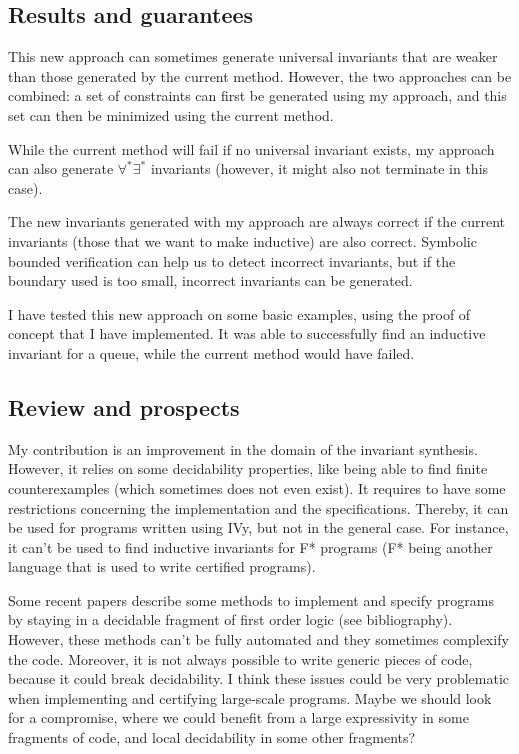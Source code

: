 \documentclass{article}
\newenvironment{point}[1]%
{\subsection*{#1}}%
{}
\begin{document}
\begin{point}{Results and guarantees}

  This new approach can sometimes generate universal invariants that are weaker than those generated by the current
  method. However, the two approaches can be combined: a set of constraints can first be generated using my approach,
  and this set can then be minimized using the current method.

  While the current method will fail if no universal invariant exists,
  my approach can also generate \(\forall^*\exists^*\) invariants (however, it might also not terminate in this case).

  The new invariants generated with my approach are always correct if the current invariants (those that we want to make inductive)
  are also correct. Symbolic bounded verification can help us to detect incorrect invariants, but if the boundary used is too small,
  incorrect invariants can be generated.

  I have tested this new approach on some basic examples, using the proof of concept that I have implemented.
  It was able to successfully find an inductive invariant for a queue, while the current method would have failed.

\end{point}


\begin{point}{Review and prospects}

  My contribution is an improvement in the domain of the invariant synthesis.
  However, it relies on some decidability properties, like being able to find finite counterexamples (which sometimes does not even exist).
  It requires to have some restrictions concerning the implementation and the specifications.
  Thereby, it can be used for programs written using IVy, but not in the general case.
  For instance, it can't be used to find inductive invariants for F* programs (F* being another language that is used to write certified programs).
  
  Some recent papers describe some methods to implement and specify programs by staying in a decidable fragment of first order logic (see bibliography).
  However, these methods can't be fully automated and they sometimes complexify the code. Moreover, it is not always possible
  to write generic pieces of code, because it could break decidability.
  I think these issues could be very problematic when implementing and certifying large-scale programs.
  Maybe we should look for a compromise, where we could benefit from a large expressivity in some fragments of code, and local decidability in some other fragments?

\end{point}
\end{document}
